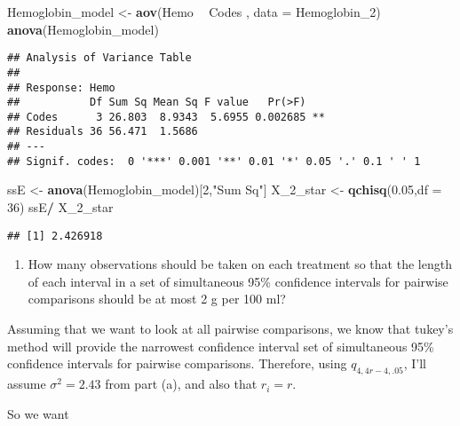 \documentclass[12pt,]{article}
\newenvironment{Shaded}{\begin{snugshade}}{\end{snugshade}}
\newcommand{\KeywordTok}[1]{\textcolor[rgb]{0.13,0.29,0.53}{\textbf{#1}}}
\newcommand{\DataTypeTok}[1]{\textcolor[rgb]{0.13,0.29,0.53}{#1}}
\newcommand{\DecValTok}[1]{\textcolor[rgb]{0.00,0.00,0.81}{#1}}
\newcommand{\FloatTok}[1]{\textcolor[rgb]{0.00,0.00,0.81}{#1}}
\newcommand{\StringTok}[1]{\textcolor[rgb]{0.31,0.60,0.02}{#1}}
\newcommand{\OperatorTok}[1]{\textcolor[rgb]{0.81,0.36,0.00}{\textbf{#1}}}
\newcommand{\NormalTok}[1]{#1}
\providecommand{\tightlist}{%
  \setlength{\itemsep}{0pt}\setlength{\parskip}{0pt}}
\begin{document}
\begin{Shaded}
\begin{Highlighting}[]
\NormalTok{Hemoglobin_model <-}\StringTok{ }\KeywordTok{aov}\NormalTok{(Hemo }\OperatorTok{~}\StringTok{ }\NormalTok{Codes , }\DataTypeTok{data =}\NormalTok{ Hemoglobin_}\DecValTok{2}\NormalTok{)}
\KeywordTok{anova}\NormalTok{(Hemoglobin_model)}
\end{Highlighting}
\end{Shaded}

\begin{verbatim}
## Analysis of Variance Table
## 
## Response: Hemo
##           Df Sum Sq Mean Sq F value   Pr(>F)   
## Codes      3 26.803  8.9343  5.6955 0.002685 **
## Residuals 36 56.471  1.5686                    
## ---
## Signif. codes:  0 '***' 0.001 '**' 0.01 '*' 0.05 '.' 0.1 ' ' 1
\end{verbatim}

\begin{Shaded}
\begin{Highlighting}[]
\NormalTok{ssE <-}\StringTok{ }\KeywordTok{anova}\NormalTok{(Hemoglobin_model)[}\DecValTok{2}\NormalTok{,}\StringTok{"Sum Sq"}\NormalTok{]}
\NormalTok{X_2_star <-}\StringTok{ }\KeywordTok{qchisq}\NormalTok{(}\FloatTok{0.05}\NormalTok{,}\DataTypeTok{df =} \DecValTok{36}\NormalTok{)}
\NormalTok{ssE}\OperatorTok{/}\StringTok{ }\NormalTok{X_2_star}
\end{Highlighting}
\end{Shaded}

\begin{verbatim}
## [1] 2.426918
\end{verbatim}

\begin{enumerate}
\def\labelenumi{(\alph{enumi})}
\setcounter{enumi}{1}
\tightlist
\item
  How many observations should be taken on each treatment so that the
  length of each interval in a set of simultaneous 95\% confidence
  intervals for pairwise comparisons should be at most 2 g per 100 ml?
\end{enumerate}

Assuming that we want to look at all pairwise comparisons, we know that
tukey's method will provide the narrowest confidence interval set of
simultaneous 95\% confidence intervals for pairwise comparisons.
Therefore, using \(q_{4,4r-4,.05}\), I'll assume \(\sigma^2 = 2.43\)
from part (a), and also that \(r_i = r\).

So we want
\end{document}
